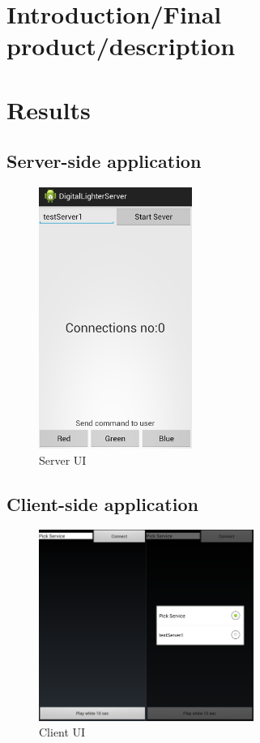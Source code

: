 \section{Introduction/Final product/description}
\section{Results}
\subsection{Server-side application}
\begin{figure}[H]
	\centering
		\includegraphics[width=5cm]{conclusion/server_ui.png}
	\caption{Server UI}
	\label{fig:Server_UI }
\end{figure}

\subsection{Client-side application}
\begin{figure}[H]
	\centering
		\includegraphics[width=7cm]{conclusion/user_ui.png}
	\caption{Client UI}
	\label{fig:Client_UI }
\end{figure}
